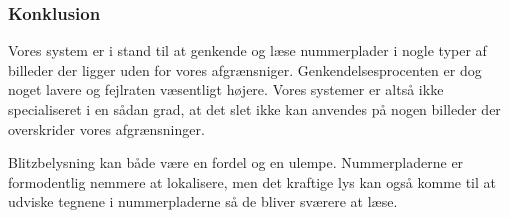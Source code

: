 \subsubsection{Konklusion}
Vores system er i stand til at genkende og læse nummerplader i nogle typer af billeder der ligger uden for vores afgrænsniger. Genkendelsesprocenten er dog noget lavere og fejlraten væsentligt højere. Vores systemer er altså ikke specialiseret i en sådan grad, at det slet ikke kan anvendes på nogen billeder der overskrider vores afgrænsninger.

Blitzbelysning kan både være en fordel og en ulempe. Nummerpladerne er formodentlig nemmere at lokalisere, men det kraftige lys kan også komme til at udviske tegnene i nummerpladerne så de bliver sværere at læse. 


